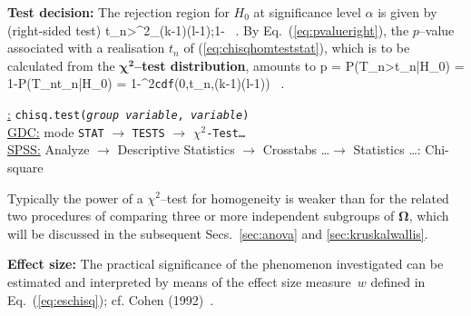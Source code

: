 \medskip
\noindent
\textbf{Test decision:} The rejection region for $H_{0}$ at 
significance level $\alpha$ is given by (right-sided test)
%
\be
t_{n}>\chi^{2}_{(k-1)\times(l-1);1-\alpha} \ .
\ee
%
By Eq.~(\ref{eq:pvalueright}), the $p$--value associated with a 
realisation $t_{n}$ of (\ref{eq:chisqhomteststat}), which is to
be calculated from the $\boldsymbol{\chi^{2}}$\textbf{--test
distribution}, amounts to
%
\be
p = P(T_{n}>t_{n}|H_{0}) = 1-P(T_{n}\leq t_{n}|H_{0})
= 1-\chi^{2}\texttt{cdf}\left(0,t_{n},(k-1)\times(l-1)\right) \ .
\ee
%

\medskip
\noindent
\underline{\R:} \texttt{chisq.test(\textit{group variable},
\textit{variable})} \\
\underline{GDC:} mode \texttt{STAT} $\rightarrow$ \texttt{TESTS}
$\rightarrow$ \texttt{$\chi^{2}$-Test\ldots}\\
\underline{SPSS:} Analyze $\rightarrow$ Descriptive Statistics
$\rightarrow$ Crosstabs \ldots $\rightarrow$ Statistics \ldots:
Chi-square

\medskip
\noindent
Typically the power of a $\chi^{2}$--test for homogeneity is 
weaker than for the related two procedures of comparing three or
more independent subgroups of $\boldsymbol{\Omega}$, which will be 
discussed in the subsequent Secs.~\ref{sec:anova} and 
\ref{sec:kruskalwallis}.

\medskip
\noindent
\textbf{Effect size:} The practical significance of the phenomenon investigated can be estimated and interpreted by means of the
effect size measure~$w$ defined in Eq.~(\ref{eq:eschisq});
cf. Cohen (1992)~.

